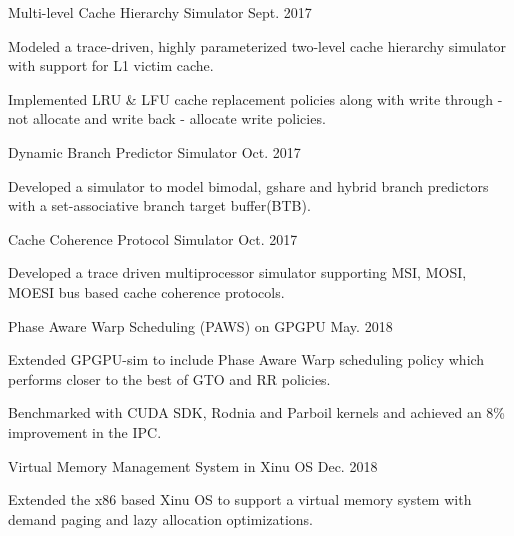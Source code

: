 \begin{cvprojects}
     \cvproject
    {Multi-level Cache Hierarchy Simulator }
    {\color{darkgray}Sept. 2017}
    {
      \begin{cvprojectitems}
        \item {Modeled a trace-driven, highly parameterized two-level cache hierarchy simulator with support for L1 victim cache. }
        \item {Implemented LRU \& LFU cache replacement policies along with write through - not allocate and write back - allocate write policies.} 
      \end{cvprojectitems}
    }


    \cvproject
    {Dynamic Branch Predictor Simulator }
    {\color{darkgray}Oct. 2017}
    {
      \begin{cvprojectitems1}
        \item {Developed a simulator to model bimodal, gshare and hybrid branch predictors with a set-associative branch target buffer(BTB). }
      \end{cvprojectitems1}
    }
    \par\addvspace{-1ex}
     \cvproject
    {Cache Coherence Protocol Simulator }
    {\color{darkgray}Oct. 2017}
    { \begin{cvprojectitems1}
        \item {Developed a trace driven multiprocessor simulator supporting MSI, MOSI, MOESI bus based cache coherence protocols.} %
      \end{cvprojectitems1}
    }
    \par\addvspace{-1ex}
    \cvproject
    {Phase Aware Warp Scheduling (PAWS) on GPGPU }
    {\color{darkgray}May. 2018}
    {
      \begin{cvprojectitems}
        \item {Extended GPGPU-sim to include Phase Aware Warp scheduling policy which performs closer to the best of GTO and RR policies.}
        \item {Benchmarked with CUDA SDK, Rodnia and Parboil kernels and achieved an 8\% improvement in the IPC.} 
      \end{cvprojectitems}
    }
    \par\addvspace{0ex}
    \cvproject
    {Virtual Memory Management System in Xinu OS }
    {\color{darkgray}Dec. 2018}
    {
      \begin{cvprojectitems1}
        \item {Extended the x86 based Xinu OS to support a virtual memory system with demand paging and lazy allocation optimizations. }
      \end{cvprojectitems1}
    }

\end{cvprojects}
